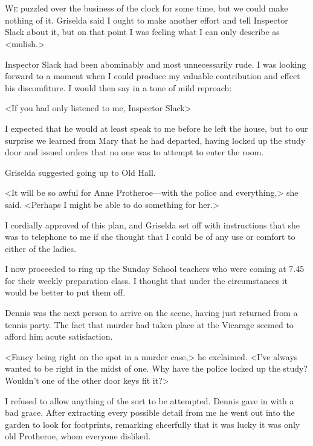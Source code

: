 \chapter[Chapter  \thechapter]{}


\lettrine{W}{e} puzzled over the business of the clock for some time, but we could make nothing of it. Griselda said I ought to make another effort and tell Inspector Slack about it, but on that point I was feeling what I can only describe as <mulish.>

Inspector Slack had been abominably and most unnecessarily rude. I was looking forward to a moment when I could produce my valuable contribution and effect his discomfiture. I would then say in a tone of mild reproach:

<If you had only listened to me, Inspector Slack\longdash>

I expected that he would at least speak to me before he left the house, but to our surprise we learned from Mary that he had departed, having locked up the study door and issued orders that no one was to attempt to enter the room.

Griselda suggested going up to Old Hall.

<It will be so awful for Anne Protheroe—with the police and everything,> she said. <Perhaps I might be able to do something for her.>

I cordially approved of this plan, and Griselda set off with instructions that she was to telephone to me if she thought that I could be of any use or comfort to either of the ladies.

I now proceeded to ring up the Sunday School teachers who were coming at 7.45 for their weekly preparation class. I thought that under the circumstances it would be better to put them off.

Dennis was the next person to arrive on the scene, having just returned from a tennis party. The fact that murder had taken place at the Vicarage seemed to afford him acute satisfaction.

<Fancy being right on the spot in a murder case,> he exclaimed. <I've always wanted to be right in the midst of one. Why have the police locked up the study? Wouldn't one of the other door keys fit it?>

I refused to allow anything of the sort to be attempted. Dennis gave in with a bad grace. After extracting every possible detail from me he went out into the garden to look for footprints, remarking cheerfully that it was lucky it was only old Protheroe, whom everyone disliked.

